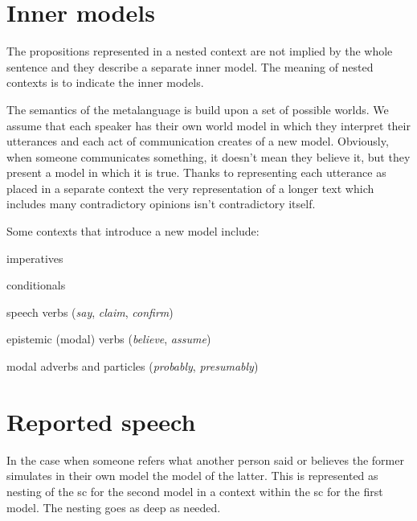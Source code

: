 \documentclass[11pt]{article}
\begin{document}
\section{Inner models} \label{sec:inner_models}
The propositions represented in a nested context are not implied by the whole sentence and they describe a separate inner model. The meaning of nested contexts is to indicate the inner models. 

The semantics of the metalanguage is build upon a set of possible worlds. We assume that each speaker has their own world model in which they interpret their utterances and each act of communication creates of a new model. Obviously, when someone communicates something, it doesn't mean they believe it, but they present a model in which it is true. Thanks to representing each utterance as placed in a separate context the very representation of a longer text which includes many contradictory opinions isn't contradictory itself.

Some contexts that introduce a new model include:
\begin{compactenum}
  \item imperatives
  \item conditionals
  \item speech verbs (\textit{say}, \textit{claim}, \textit{confirm})
  \item epistemic (modal) verbs (\textit{believe}, \textit{assume})
  \item modal adverbs and particles (\textit{probably}, \textit{presumably})
\end{compactenum}

\section{Reported speech} \label{sec:reported_speech}
In the case when someone refers what another person said or believes the former simulates in their own model the model of the latter. This is represented as nesting of the {\sc sc} for the second model in a context within the {\sc sc} for the first model. The nesting goes as deep as needed.
\end{document}
